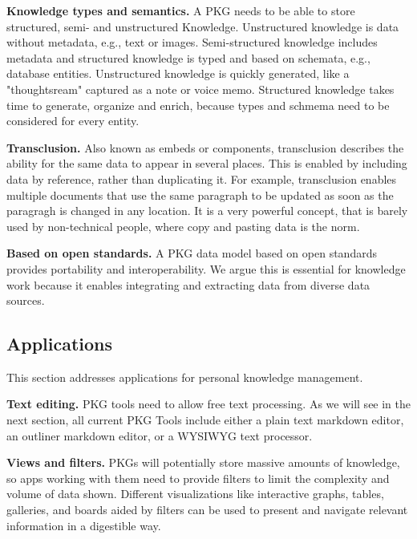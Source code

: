 \textbf{Knowledge types and semantics.} A PKG needs to be able to store structured, semi- and unstructured Knowledge. Unstructured knowledge is data without metadata, e.g., text or images. Semi-structured knowledge includes metadata and structured knowledge is typed and based on schemata, e.g., database entities. Unstructured knowledge is quickly generated, like  a "thoughtsream" captured as a note or voice memo. Structured knowledge takes time to generate, organize and enrich, because types and schmema need to be considered for every entity. 

\textbf{Transclusion.} Also known as embeds or components, transclusion describes the ability for the same data to appear in several places. This is enabled by including data by reference, rather than duplicating it. For example, transclusion enables multiple documents that use the same paragraph to be updated as soon as the paragragh is changed in any location. It is a very powerful concept, that is barely used by non-technical people, where copy and pasting data is the norm.

\textbf{Based on open standards.} A PKG data model based on open standards provides portability and interoperability. We argue this is essential for knowledge work because it enables integrating and extracting data from diverse data sources.

\subsection*{Applications}
This section addresses applications for personal knowledge management. 

\textbf{Text editing.} PKG tools need to allow free text processing. As we will see in the next section, all current PKG Tools include either a plain text markdown editor, an outliner markdown editor, or a WYSIWYG text processor.

\textbf{Views and filters.} PKGs will potentially store massive amounts of knowledge, so apps working with them need to provide filters to limit the complexity and volume of data shown. Different visualizations like interactive graphs, tables, galleries, and boards aided by filters can be used to present and navigate relevant information in a digestible way.


